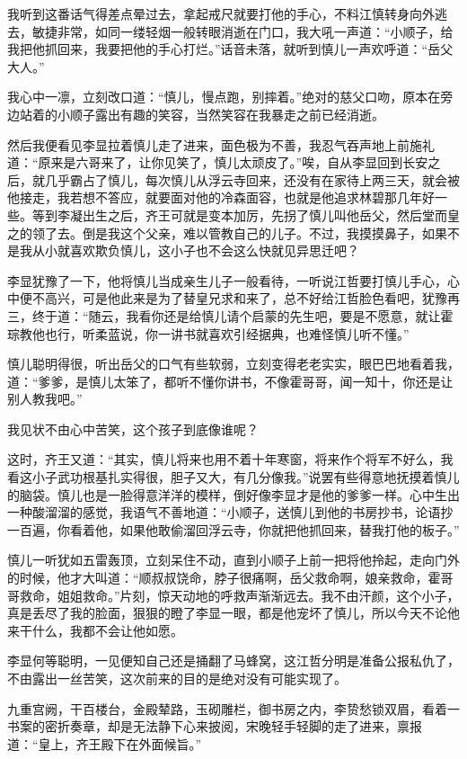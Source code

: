 我听到这番话气得差点晕过去，拿起戒尺就要打他的手心，不料江慎转身向外逃去，敏捷非常，如同一缕轻烟一般转眼消逝在门口，我大吼一声道：“小顺子，给我把他抓回来，我要把他的手心打烂。”话音未落，就听到慎儿一声欢呼道：“岳父大人。”

我心中一凛，立刻改口道：“慎儿，慢点跑，别摔着。”绝对的慈父口吻，原本在旁边站着的小顺子露出有趣的笑容，当然笑容在我暴走之前已经消逝。

然后我便看见李显拉着慎儿走了进来，面色极为不善，我忍气吞声地上前施礼道：“原来是六哥来了，让你见笑了，慎儿太顽皮了。”唉，自从李显回到长安之后，就几乎霸占了慎儿，每次慎儿从浮云寺回来，还没有在家待上两三天，就会被他接走，我若想不答应，就要面对他的冷森面容，也就是他追求林碧那几年好一些。等到李凝出生之后，齐王可就是变本加厉，先拐了慎儿叫他岳父，然后堂而皇之的领了去。倒是我这个父亲，难以管教自己的儿子。不过，我摸摸鼻子，如果不是我从小就喜欢欺负慎儿，这小子也不会这么快就见异思迁吧？

李显犹豫了一下，他将慎儿当成亲生儿子一般看待，一听说江哲要打慎儿手心，心中便不高兴，可是他此来是为了替皇兄求和来了，总不好给江哲脸色看吧，犹豫再三，终于道：“随云，我看你还是给慎儿请个启蒙的先生吧，要是不愿意，就让霍琮教他也行，听柔蓝说，你一讲书就喜欢引经据典，也难怪慎儿听不懂。”

慎儿聪明得很，听出岳父的口气有些软弱，立刻变得老老实实，眼巴巴地看着我，道：“爹爹，是慎儿太笨了，都听不懂你讲书，不像霍哥哥，闻一知十，你还是让别人教我吧。”

我见状不由心中苦笑，这个孩子到底像谁呢？

这时，齐王又道：“其实，慎儿将来也用不着十年寒窗，将来作个将军不好么，我看这小子武功根基扎实得很，胆子又大，有几分像我。”说罢有些得意地抚摸着慎儿的脑袋。慎儿也是一脸得意洋洋的模样，倒好像李显才是他的爹爹一样。心中生出一种酸溜溜的感觉，我语气不善地道：“小顺子，送慎儿到他的书房抄书，论语抄一百遍，你看着他，如果他敢偷溜回浮云寺，你就把他抓回来，替我打他的板子。”

慎儿一听犹如五雷轰顶，立刻呆住不动，直到小顺子上前一把将他拎起，走向门外的时候，他才大叫道：“顺叔叔饶命，脖子很痛啊，岳父救命啊，娘亲救命，霍哥哥救命，姐姐救命。”片刻，惊天动地的呼救声渐渐远去。我不由汗颜，这个小子，真是丢尽了我的脸面，狠狠的瞪了李显一眼，都是他宠坏了慎儿，所以今天不论他来干什么，我都不会让他如愿。

李显何等聪明，一见便知自己还是捅翻了马蜂窝，这江哲分明是准备公报私仇了，不由露出一丝苦笑，这次前来的目的是绝对没有可能实现了。

九重宫阙，干百楼台，金殿辇路，玉砌雕栏，御书房之内，李贽愁锁双眉，看着一书案的密折奏章，却是无法静下心来披阅，宋晚轻手轻脚的走了进来，禀报道：“皇上，齐王殿下在外面候旨。”

